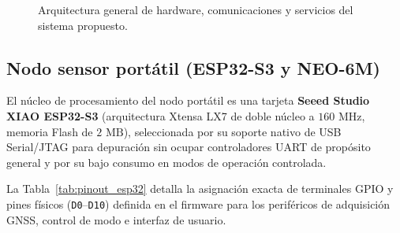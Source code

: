 \documentclass[12pt, letterpaper]{article}
\begin{document}
\begin{figure}[H]
{\begin{tikzpicture}
    \end{tikzpicture}%
    }
    \caption{Arquitectura general de hardware, comunicaciones y servicios del sistema propuesto.}
    \label{fig:arquitectura_general}
\end{figure}

\subsection*{Nodo sensor portátil (ESP32-S3 y NEO-6M)}

El núcleo de procesamiento del nodo portátil es una tarjeta \textbf{Seeed Studio XIAO ESP32-S3} (arquitectura Xtensa LX7 de doble núcleo a $160\text{ MHz}$, memoria Flash de $2\text{ MB}$), seleccionada por su soporte nativo de USB Serial/JTAG para depuración sin ocupar controladores UART de propósito general y por su bajo consumo en modos de operación controlada.

La Tabla~\ref{tab:pinout_esp32} detalla la asignación exacta de terminales GPIO y pines físicos (\texttt{D0}--\texttt{D10}) definida en el firmware para los periféricos de adquisición GNSS, control de modo e interfaz de usuario.
\end{document}

